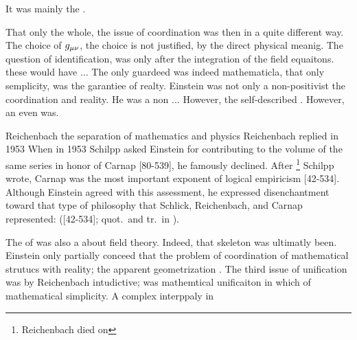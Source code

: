 \documentclass[draft]{article}
\begin{document}
It was mainly the \uftp.

That only the whole, the issue of coordination was then in a quite different way. The choice of $g_{\mu\nu}$, the choice is not justified, by the direct physical meanig. The question of identification, was only after the integration of the field equaitons. these would have ... The only guardeed was indeed mathematicla, that only semplicity, was the garantiee of realty. Einstein was not only a non-positivist the coordination and reality. He was a non ... However, the self-described   \citep[13]{Einstein1950c}. However, an even was. 



Reichenbach the separation of mathematics and physics Reichenbach replied in 1953 
When in 1953 Schilpp asked Einstein for contributing to the volume of the same series in honor of Carnap [80-539], he famously declined. After \footnote{Reichenbach died on } Schilpp wrote, Carnap was the most important exponent of logical empiricism [42-534]. Although Einstein agreed with this assessment, he expressed disenchantment toward that type of philosophy that Schlick, Reichenbach, and Carnap represented:  ([42-534]; quot.\ and tr.\ in \cite[374]{Howard1990}).

The of \gr was also a about \uft field theory. Indeed, that skeleton was ultimatly been. Einstein only partially conceed that the problem of coordination of mathematical strutucs with reality; the apparent geometrization . The third issue of unification was by Reichenbach intudictive; was mathemtical unificaiton in which of mathematical simplicity. A complex interppaly in 





\printshorthands
\printbibliography
\end{document}
